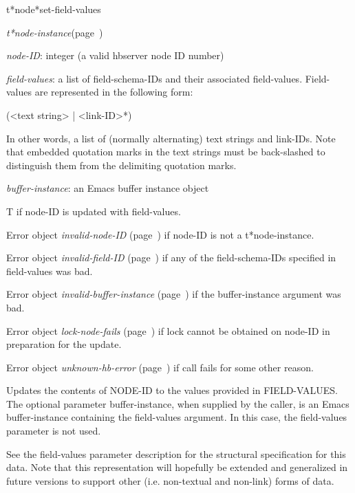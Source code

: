 \begin{description}
\item [Name:]  t*node*set-field-values

\item [Class:] {\sl t*node-instance}\hfill(page~\pageref{t*node-instance})

\item [Parameters:]
\item {\sl node-ID}:  
integer (a valid hbserver node ID number)

\item {\sl field-values}:  a list of field-schema-IDs and their 
associated field-values.  Field-values are 
represented in the following form:

({<text string> | <link-ID>}*) 

In other words, a list of (normally alternating) text
strings and link-IDs.  Note that embedded quotation marks
in the text strings must be back-slashed to distinguish
them from the delimiting quotation marks. 

\item {\sl buffer-instance}:  an Emacs buffer instance object


\item [Return-value:]
T if node-ID is updated with field-values.

Error object {\sl invalid-node-ID} (page~\pageref{invalid-node-ID}) if node-ID
is not a t*node-instance.

Error object {\sl invalid-field-ID} (page~\pageref{invalid-field-ID}) if any of the 
field-schema-IDs specified in field-values was bad.

Error object {\sl invalid-buffer-instance} (page~\pageref{invalid-buffer-instance}) if the 
buffer-instance argument was bad.

Error object {\sl lock-node-fails} (page~\pageref{lock-node-fails}) if lock cannot 
be obtained on node-ID in preparation for the update.

Error object {\sl unknown-hb-error} (page~\pageref{unknown-hb-error}) if call fails
for some other reason.

\item [Description:]
Updates the contents of NODE-ID to the values provided
in FIELD-VALUES. The optional parameter buffer-instance,
when supplied by the caller, is an Emacs buffer-instance
containing the field-values argument.  In this case, 
the field-values parameter is not used. 

See the field-values parameter description for the
structural specification for this data. Note that this
representation will hopefully be extended and generalized
in future versions to support other (i.e. non-textual and
non-link) forms of data.

\item [Public:]



\end{description}
\horizontalline

